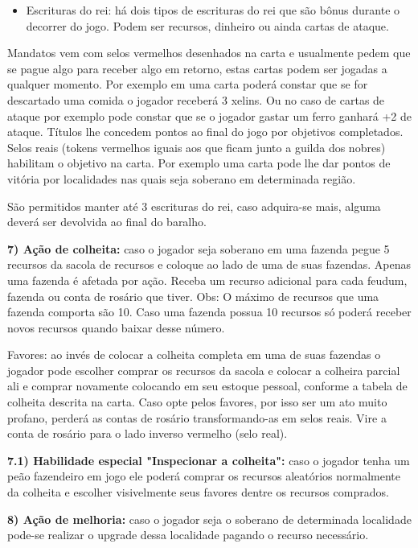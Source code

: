 \documentclass[11pt]{article}
\begin{document}
\begin{itemize}
\item Escrituras do rei: há dois tipos de escrituras do rei que são bônus durante o decorrer do jogo. Podem ser recursos, dinheiro ou ainda cartas de ataque.
\end{itemize}
Mandatos vem com selos vermelhos desenhados na carta e usualmente pedem que se pague algo para receber algo em retorno, estas cartas podem ser jogadas a qualquer momento.
Por exemplo em uma carta poderá constar que se for descartado uma comida o jogador receberá 3 xelins.
Ou no caso de cartas de ataque por exemplo pode constar que se o jogador gastar um ferro ganhará +2 de ataque.
Títulos lhe concedem pontos ao final do jogo por objetivos completados. Selos reais (tokens vermelhos iguais aos que ficam junto a guilda dos nobres) habilitam o objetivo na carta.
Por exemplo uma carta pode lhe dar pontos de vitória por localidades nas quais seja soberano em determinada região.

São permitidos manter até 3 escrituras do rei, caso adquira-se mais, alguma deverá ser devolvida ao final do baralho.

\textbf{7) Ação de colheita:} caso o jogador seja soberano em uma fazenda pegue 5 recursos da sacola de recursos e coloque ao lado de uma de suas fazendas. Apenas uma fazenda é afetada por ação.
Receba um recurso adicional para cada feudum, fazenda ou conta de rosário que tiver.
Obs: O máximo de recursos que uma fazenda comporta são 10. Caso uma fazenda possua 10 recursos só poderá receber novos recursos quando baixar desse número.

Favores: ao invés de colocar a colheita completa em uma de suas fazendas o jogador pode escolher comprar os recursos da sacola e colocar a colheira parcial ali e comprar novamente colocando
em seu estoque pessoal, conforme a tabela de colheita descrita na carta. Caso opte pelos favores, por isso ser um ato muito profano, perderá as contas de rosário transformando-as em selos reais.
Vire a conta de rosário para o lado inverso vermelho (selo real).

\textbf{7.1) Habilidade especial "Inspecionar a colheita":} caso o jogador tenha um peão fazendeiro em jogo ele poderá comprar os recursos aleatórios normalmente da colheita e escolher visivelmente seus favores dentre os recursos comprados.

\textbf{8) Ação de melhoria:} caso o jogador seja o soberano de determinada localidade pode-se realizar o upgrade dessa localidade pagando o recurso necessário.
\end{document}
